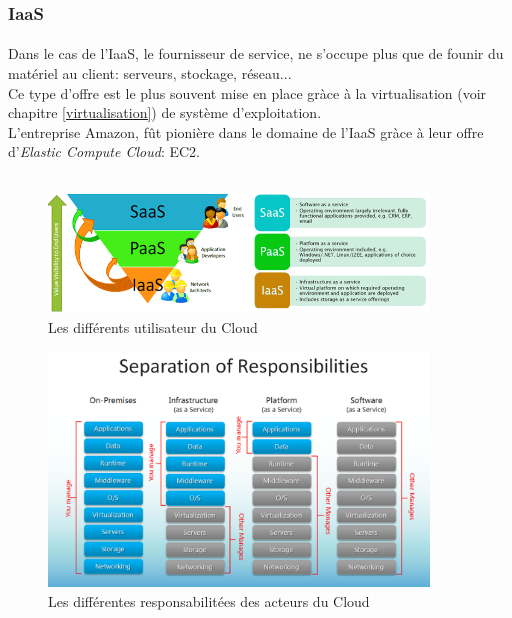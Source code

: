 \subsubsection{IaaS}
\paragraph*{}
Dans le cas de l'IaaS, le fournisseur de service, ne s'occupe plus que de founir du matériel au client: serveurs, stockage, réseau...
\\
Ce type d'offre est le plus souvent mise en place gràce à la virtualisation (voir chapitre \ref{virtualisation}) de système d'exploitation.
\\
L'entreprise Amazon, fût pionière dans le domaine de l'IaaS gràce à leur offre d'\textsl{Elastic Compute Cloud}: EC2.

\subsection*{} %
\begin{figure}
\centering
\includegraphics[width=0.9\textwidth]{resource/img/clouds-users}
\caption{Les différents utilisateur du Cloud}
\end{figure}
\begin{figure}
\centering
\includegraphics[width=0.9\textwidth]{resource/img/clouds-responsabilities}
\caption{Les différentes responsabilitées des acteurs du Cloud}
\end{figure}

